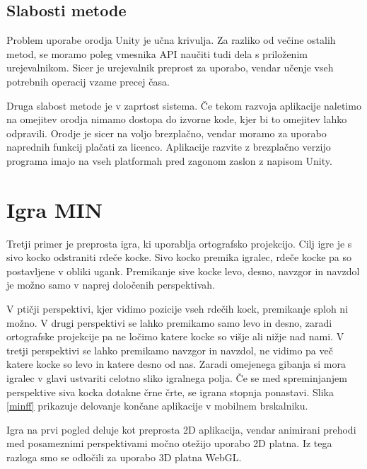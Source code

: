 \subsection{Slabosti metode}

Problem uporabe orodja Unity je učna krivulja. Za razliko od večine ostalih metod, se moramo poleg vmesnika API naučiti tudi dela s priloženim urejevalnikom. Sicer je urejevalnik preprost za uporabo, vendar učenje vseh potrebnih operacij vzame precej časa.

Druga slabost metode je v zaprtost sistema. Če tekom razvoja aplikacije naletimo na omejitev orodja nimamo dostopa do izvorne kode, kjer bi to omejitev lahko odpravili. Orodje je sicer na voljo brezplačno, vendar moramo za uporabo naprednih funkcij plačati za licenco. Aplikacije razvite z brezplačno verzijo programa imajo na vseh platformah pred zagonom zaslon z napisom Unity. 

\section{Igra MIN}

Tretji primer je preprosta igra, ki uporablja ortografsko projekcijo. Cilj igre je s sivo kocko odstraniti rdeče kocke. Sivo kocko premika igralec, rdeče kocke pa so postavljene v obliki ugank. Premikanje sive kocke levo, desno, navzgor in navzdol je možno samo v naprej določenih perspektivah. 

V ptičji perspektivi, kjer vidimo pozicije vseh rdečih kock, premikanje sploh ni možno. V drugi perspektivi se lahko premikamo samo levo in desno, zaradi ortografske projekcije pa ne ločimo katere kocke so višje ali nižje nad nami. V tretji perspektivi se lahko premikamo navzgor in navzdol, ne vidimo pa več katere kocke so levo in katere desno od nas. Zaradi omejenega gibanja si mora igralec v glavi ustvariti celotno sliko igralnega polja. Če se med spreminjanjem perspektive siva kocka dotakne črne črte, se igrana stopnja ponastavi. Slika \ref{minff} prikazuje delovanje končane aplikacije v mobilnem brskalniku.

Igra na prvi pogled deluje kot preprosta 2D aplikacija, vendar animirani prehodi med posameznimi perspektivami močno otežijo uporabo 2D platna. Iz tega razloga smo se odločili za uporabo 3D platna WebGL. %

